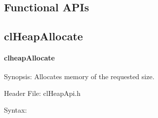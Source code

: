 \begin{flushleft}
\section{Functional APIs}


\subsection{clHeapAllocate}
\hypertarget{pageheap128}{}\paragraph{cl\-heap\-Allocate}\label{pageheap128}
\begin{Desc}
\item[Synopsis:]Allocates memory of the requested size.\end{Desc}
\begin{Desc}
\item[Header File:]clHeapApi.h\end{Desc}
\begin{Desc}
\item[Syntax:]


\end{Desc}
\end{flushleft}
